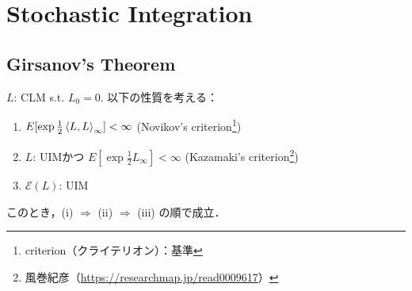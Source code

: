 \documentclass{jsarticle}
\title{}
\author{}
\date{
}
\begin{document}
\setcounter{section}{4}
\section{Stochastic Integration}
\setcounter{subsection}{4}
\subsection{Girsanov's Theorem}

\setcounter{thm}{22}
\begin{shadebox}
    \begin{thm}
    \label{thm:523}
        $L$: CLM s.t. $L_0=0.$
        以下の性質を考える：
        \begin{enumerate}[label=(\roman*)]
            \item
            $E[\exp\frac{1}{2}\left\langle L,L\right\rangle_{\infty}]<\infty$
            (Novikov's criterion\footnote{criterion（クライテリオン）：基準})
            \item
            $L$: UIMかつ $E[\exp\frac{1}{2}L_{\infty}]<\infty$
            (Kazamaki's criterion\footnote{風巻紀彦（\url{https://researchmap.jp/read0009617}）})
            \item
            $\mathcal{E}(L)$: UIM
        \end{enumerate}
        このとき，(i) $\Rightarrow$ (ii) $\Rightarrow$ (iii) の順で成立．
    \end{thm}
\end{shadebox}
\end{document}
